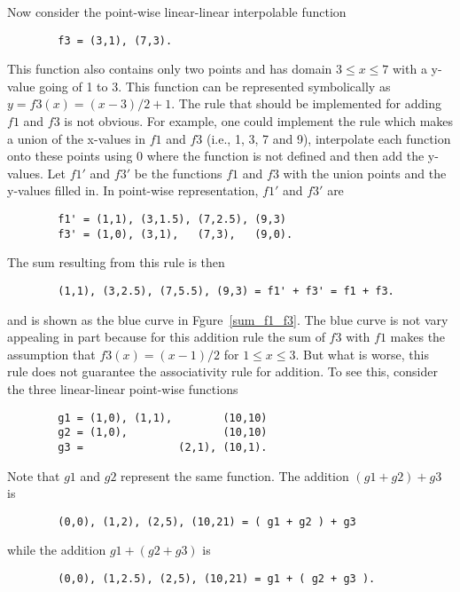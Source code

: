 \documentclass[11pt]{article}
\begin{document}
Now consider the point-wise linear-linear interpolable function
\begin{verbatim}
        f3 = (3,1), (7,3).
\end{verbatim}
This function also contains only two points and has domain $3 \le x \le 7$ with a y-value going of 1 to 3. This function
can be represented symbolically as $y = f3(x) = ( x - 3 ) / 2 + 1$. The rule that should be implemented for 
adding $f1$ and $f3$ is not obvious. For example, one could implement the rule which makes a union of the x-values 
in $f1$ and $f3$ (i.e., 1, 3, 7 and 9),
interpolate each function onto these points using 0 where the function is not defined and then add the y-values.
Let $f1'$ and $f3'$ be the functions $f1$ and $f3$ with the union points and the y-values filled in. In
point-wise representation, $f1'$ and $f3'$ are
\begin{verbatim}
        f1' = (1,1), (3,1.5), (7,2.5), (9,3)
        f3' = (1,0), (3,1),   (7,3),   (9,0).
\end{verbatim}
The sum resulting from this rule is then
\begin{verbatim}
        (1,1), (3,2.5), (7,5.5), (9,3) = f1' + f3' = f1 + f3.
\end{verbatim}
and is shown as the blue curve in Fgure~\ref{sum_f1_f3}. The blue curve is not vary appealing in part because for this addition rule the
sum of $f3$ with $f1$ makes the assumption that $f3(x) = ( x - 1 ) / 2$ for $1 \le x \le 3$.
But what is worse, this rule does not guarantee the associativity rule for addition. To see this, consider the three 
linear-linear point-wise functions
\begin{verbatim}
        g1 = (1,0), (1,1),        (10,10)
        g2 = (1,0),               (10,10)
        g3 =               (2,1), (10,1).
\end{verbatim}
Note that $g1$ and $g2$ represent the same function.
The addition $(g1 + g2) + g3$ is
\begin{verbatim}
        (0,0), (1,2), (2,5), (10,21) = ( g1 + g2 ) + g3
\end{verbatim}
while the addition $g1 + (g2 + g3)$ is
\begin{verbatim}
        (0,0), (1,2.5), (2,5), (10,21) = g1 + ( g2 + g3 ).
\end{verbatim}

\end{document}
